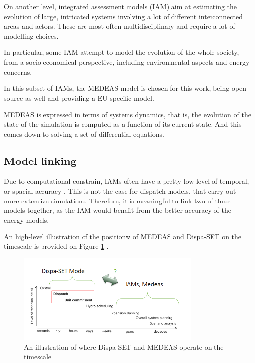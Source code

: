 On another level, integrated assessment models (IAM) aim at estimating the evolution of large, intricated systems involving a lot of different interconnected areas and actors. These are most often multidisciplinary and require a lot of modelling choices.

In particular, some IAM attempt to model the evolution of the whole society, from a socio-economical perspective, including environmental aspects and energy concerns.

In this subset of IAMs, the MEDEAS model is chosen for this work, being open-source as well and providing a EU-specific model.

MEDEAS is expressed in terms of systems dynamics, that is, the evolution of the state of the simulation is computed as a function of its current state. And this comes down to solving a set of differential equations.

\subsection{Model linking}

Due to computational constrain, IAMs often have a pretty low level of temporal, or spacial accuracy \cite{linkings-stuff}. This is not the case for dispatch models, that carry out more extensive simulations. Therefore, it is meaningful to link two of these models together, as the IAM would benefit from the better accuracy of the energy models. 

An high-level illustration of the positionw of MEDEAS and Dispa-SET on the timescale is provided on Figure \ref{fig:dispaset-medeas-timescale} \cite{dispaset}.

\begin{figure}[h]
    \centering
    \includegraphics[width=0.8\textwidth]{resources/images/dispaset-medeas-timescale.png}
    \caption{An illustration of where Dispa-SET and MEDEAS operate on the timescale}
    \label{fig:dispaset-medeas-timescale}
\end{figure}

